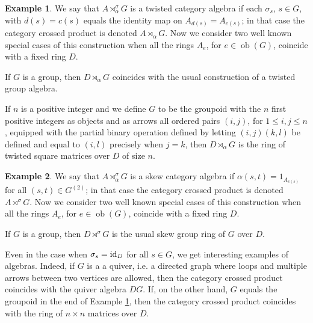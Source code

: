 \documentclass[11pt,leqno]{amsart}
\theoremstyle{plain}
\theoremstyle{definition}
\newtheorem{exmp}{Example}
\DeclareMathOperator{\ob}{ob}
\begin{document}
\begin{exmp}\label{example2}
We say that $A \rtimes_{\alpha}^{\sigma} G$ is a
twisted category algebra
if each $\sigma_s$, $s \in G$, with $d(s)=c(s)$
equals the identity map on $A_{d(s)}=A_{c(s)}$;
in that case the category crossed product is
denoted $A \rtimes_{\alpha} G$.
Now we consider two well known special
cases of this construction when
all the rings $A_e$, for $e \in \ob(G)$,
coincide with a fixed ring $D$.

If $G$ is a group, then $D \rtimes_{\alpha} G$
coincides with the usual construction of a twisted group algebra.

If $n$ is a positive integer and we define
$G$ to be the groupoid with the $n$ first positive integers as objects and
as arrows all ordered pairs $(i,j)$, for $1 \leq i,j \leq n$,
equipped with the partial binary operation
defined by letting $(i,j)(k,l)$ be defined and equal to $(i,l)$
precisely when $j=k$, then
$D \rtimes_{\alpha} G$ is the ring of
twisted square matrices over $D$ of size $n$.
\end{exmp}


\begin{exmp}\label{example3}
We say that $A \rtimes_{\alpha}^{\sigma} G$
is a skew category algebra
if $\alpha(s,t) = 1_{A_{c(s)}}$ for all $(s,t) \in G^{(2)}$;
in that case the category crossed product is
denoted $A \rtimes^{\sigma} G$.
Now we consider two well known special
cases of this construction when
all the rings $A_e$, for $e \in \ob(G)$,
coincide with a fixed ring $D$.

If $G$ is a group, then $D \rtimes^{\sigma} G$
is the usual skew group ring of $G$ over $D$.

Even in the case when $\sigma_s = {\rm id}_D$
for all $s \in G$, we get interesting examples of algebras.
Indeed, if $G$ is a a quiver, i.e. a directed graph
where loops and multiple arrows between two vertices are allowed,
then the category crossed product
coincides with the quiver algebra $DG$.
If, on the other hand, $G$ equals the groupoid in the
end of Example \ref{example2}, then
the category crossed product coincides
with the ring of $n \times n$ matrices over $D$.
\end{exmp}
\end{document}
